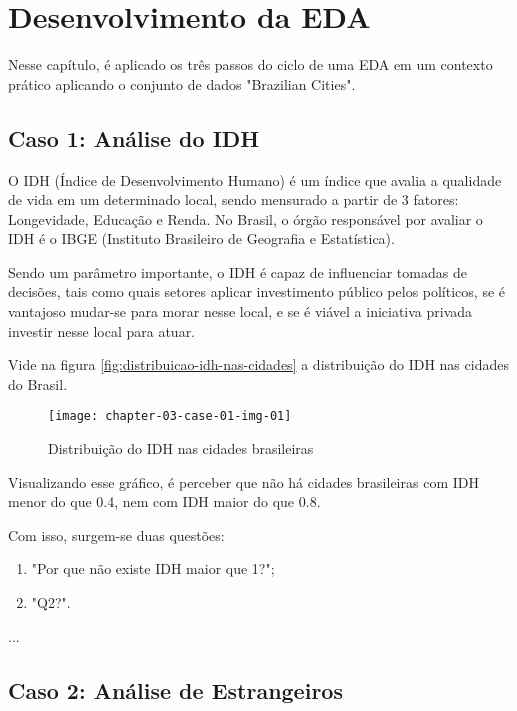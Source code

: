 \chapter{Desenvolvimento da EDA}

Nesse capítulo, é aplicado os três passos do ciclo de uma EDA em um contexto prático aplicando o conjunto de dados "Brazilian Cities".

\section{Caso 1: Análise do IDH}

O IDH (Índice de Desenvolvimento Humano) é um índice que avalia a qualidade de vida em um determinado local, sendo mensurado a partir de 3 fatores: Longevidade, Educação e Renda. No Brasil, o órgão responsável por avaliar o IDH é o IBGE (Instituto Brasileiro de Geografia e Estatística).

Sendo um parâmetro importante, o IDH é capaz de influenciar tomadas de decisões, tais como quais setores aplicar investimento público pelos políticos, se é vantajoso mudar-se para morar nesse local, e se é viável a iniciativa privada investir nesse local para atuar.

Vide na figura \autoref{fig:distribuicao-idh-nas-cidades} a distribuição do IDH nas cidades do Brasil.

\begin{figure}[H]
  \centering
  \caption{\label{fig:distribuicao-idh-nas-cidades}Distribuição do IDH nas cidades brasileiras}
  \label{fig:der}
  \texttt{[image: chapter-03-case-01-img-01]}
\end{figure}

Visualizando esse gráfico, é perceber que não há cidades brasileiras com IDH menor do que 0.4, nem com IDH maior do que 0.8.

Com isso, surgem-se duas questões: 

\begin{enumerate}
	\item "Por que não existe IDH maior que 1?";
	\item "Q2?".
\end{enumerate}	

...

\section{Caso 2: Análise de Estrangeiros}

